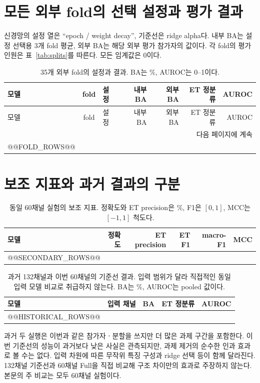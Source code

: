 \documentclass[11pt,a4paper]{article}
\numberwithin{equation}{section}
\begin{document}
\clearpage\appendix
\section{모든 외부 fold의 선택 설정과 평가 결과}
\small
신경망의 설정 열은 ``epoch / weight decay'', 기준선은 ridge alpha다.
내부 BA는 설정 선택용 3개 fold 평균, 외부 BA는 해당 외부 평가 참가자의 값이다.
각 fold의 평가 인원은 표~\ref{tab:splits}를 따른다. 모든 임계값은 0이다.
\begin{longtable}{@{}lclrrrr@{}}
\caption{35개 외부 fold의 설정과 결과. BA는 \%, AUROC는 0--1이다.}\label{tab:allfolds}\\
\toprule 모델 & fold & 설정 & 내부 BA & 외부 BA & ET 정분류 & AUROC\\\midrule\endfirsthead
\toprule 모델 & fold & 설정 & 내부 BA & 외부 BA & ET 정분류 & AUROC\\\midrule\endhead
\midrule\multicolumn{7}{r}{다음 페이지에 계속}\\\endfoot
\bottomrule\endlastfoot
@@FOLD_ROWS@@
\end{longtable}
\normalsize

\section{보조 지표와 과거 결과의 구분}
\begin{table}[H]\centering\small
\caption{동일 60채널 실험의 보조 지표. 정확도와 ET precision은 \%,
F1은 $[0,1]$, MCC는 $[-1,1]$ 척도다.}
\begin{tabular}{@{}lrrrrr@{}}\toprule
 모델 & 정확도 & ET precision & ET F1 & macro-F1 & MCC\\\midrule
@@SECONDARY_ROWS@@
\bottomrule\end{tabular}
\end{table}

\begin{table}[H]\centering\small
\caption{과거 132채널과 이번 60채널의 기준선 결과. 입력 범위가 달라 직접적인
동일 입력 모델 비교로 취급하지 않는다. BA는 \%, AUROC는 pooled 값이다.}
\begin{tabular}{@{}lrrrr@{}}\toprule
 모델 & 입력 채널 & BA & ET 정분류 & AUROC\\\midrule
@@HISTORICAL_ROWS@@
\bottomrule\end{tabular}\label{tab:historical}
\end{table}
과거 두 실행은 이번과 같은 참가자ㆍ분할을 쓰지만 더 많은 과제 구간을 포함한다.
이번 기준선의 성능이 과거보다 낮은 사실은 관측되지만, 과제 제거의 순수한 인과
효과로 볼 수는 없다. 입력 차원에 따른 무작위 특징 구성과 ridge 선택 등이 함께
달라진다. 132채널 기준선과 60채널 Full을 직접 비교해 구조 차이만의 효과로
주장하지 않는다. 본문의 주 비교는 모두 60채널 실험이다.
\end{document}
